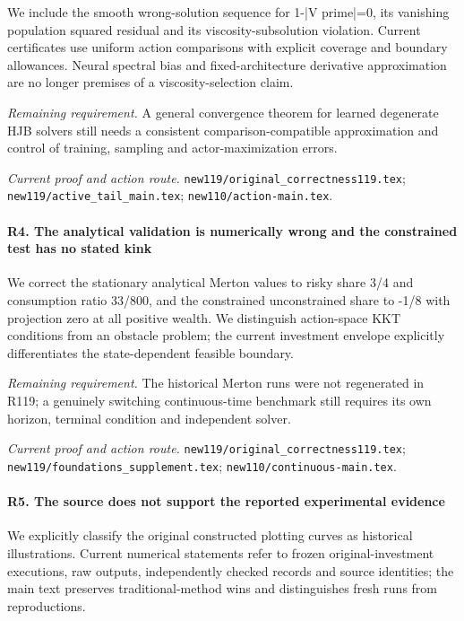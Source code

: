We include the smooth wrong-solution sequence for 1-|V prime|=0, its vanishing population squared residual and its viscosity-subsolution violation. Current certificates use uniform action comparisons with explicit coverage and boundary allowances. Neural spectral bias and fixed-architecture derivative approximation are no longer premises of a viscosity-selection claim.

\par\emph{Remaining requirement.} A general convergence theorem for learned degenerate HJB solvers still needs a consistent comparison-compatible approximation and control of training, sampling and actor-maximization errors.

\par\emph{Current proof and action route.} \nolinkurl{new119/original_correctness119.tex}; \nolinkurl{new119/active_tail_main.tex}; \nolinkurl{new110/action-main.tex}.

\paragraph{R4. The analytical validation is numerically wrong and the constrained test has no stated kink}

We correct the stationary analytical Merton values to risky share 3/4 and consumption ratio 33/800, and the constrained unconstrained share to -1/8 with projection zero at all positive wealth. We distinguish action-space KKT conditions from an obstacle problem; the current investment envelope explicitly differentiates the state-dependent feasible boundary.

\par\emph{Remaining requirement.} The historical Merton runs were not regenerated in R119; a genuinely switching continuous-time benchmark still requires its own horizon, terminal condition and independent solver.

\par\emph{Current proof and action route.} \nolinkurl{new119/original_correctness119.tex}; \nolinkurl{new119/foundations_supplement.tex}; \nolinkurl{new110/continuous-main.tex}.

\paragraph{R5. The source does not support the reported experimental evidence}

We explicitly classify the original constructed plotting curves as historical illustrations. Current numerical statements refer to frozen original-investment executions, raw outputs, independently checked records and source identities; the main text preserves traditional-method wins and distinguishes fresh runs from reproductions.

